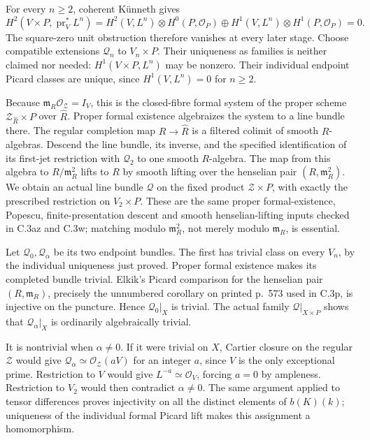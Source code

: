 For every $n\ge2$, coherent Künneth gives
\[
 H^2(V\times P,\operatorname{pr}_V^*L^n)
 =H^2(V,L^n)\otimes H^0(P,\mathcal O_P)
  \oplus H^1(V,L^n)\otimes H^1(P,\mathcal O_P)=0.
\]
The square-zero unit obstruction therefore vanishes at every later
stage. Choose compatible extensions $\mathcal Q_n$ to $V_n\times P$.
Their uniqueness as families is neither claimed nor needed:
$H^1(V\times P,L^n)$ may be nonzero. Their individual endpoint
Picard classes are unique, since $H^1(V,L^n)=0$ for $n\ge2$.

Because $\mathfrak m_R\mathcal O_{\mathcal Z}=I_V$, this is the
closed-fibre formal system of the proper scheme
$\mathcal Z_{\widehat R}\times P$ over $\widehat R$. Proper formal
existence algebraizes the system to a line bundle there. The
regular completion map $R\to\widehat R$ is a filtered colimit of
smooth $R$-algebras. Descend the line bundle, its inverse, and the
specified identification of its first-jet restriction with
$\mathcal Q_2$ to one smooth $R$-algebra. The map from this algebra
to $R/\mathfrak m_R^2$ lifts to $R$ by smooth lifting over the
henselian pair $(R,\mathfrak m_R^2)$. We obtain an actual line bundle
$\mathcal Q$ on the fixed product $\mathcal Z\times P$, with exactly
the prescribed restriction on $V_2\times P$. These are the same
proper formal-existence, Popescu, finite-presentation descent and
smooth henselian-lifting inputs checked in C.3az and C.3w; matching
modulo $\mathfrak m_R^2$, not merely modulo $\mathfrak m_R$, is essential.

Let $\mathcal Q_0,\mathcal Q_\alpha$ be its two endpoint bundles.
The first has trivial class on every $V_n$, by the individual
uniqueness just proved. Proper formal existence makes its completed
bundle trivial. Elkik's Picard comparison for the henselian pair
$(R,\mathfrak m_R)$, precisely the unnumbered corollary on printed p.~573 \citep{D_Elkik1973} used
in C.3p, is injective on the puncture. Hence
$\mathcal Q_0|_X$ is trivial. The actual family
$\mathcal Q|_{X\times P}$ shows that
$\mathcal Q_\alpha|_X$ is ordinarily algebraically trivial.

It is nontrivial when $\alpha\ne0$. If it were trivial on $X$,
Cartier closure on the regular $\mathcal Z$ would give
$\mathcal Q_\alpha\simeq\mathcal O_{\mathcal Z}(aV)$ for an integer
$a$, since $V$ is the only exceptional prime. Restriction to $V$
would give $L^{-a}\simeq\mathcal O_V$, forcing $a=0$ by ampleness.
Restriction to $V_2$ would then contradict $\alpha\ne0$.
The same argument applied to tensor differences proves injectivity
on all the distinct elements of $b(K)(k)$; uniqueness of the
individual formal Picard lift makes this assignment a homomorphism.

